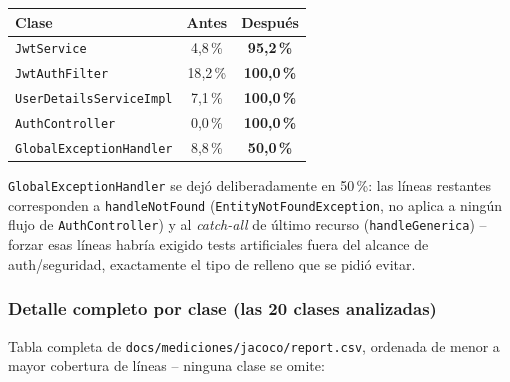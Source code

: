 \documentclass[12pt,a4paper]{article}
\begin{document}
\begin{center}
\begin{tabular}{|l|c|c|}
\hline
\rowcolor{verdeuteq}
\color{white}\textbf{Clase} & \color{white}\textbf{Antes} & \color{white}\textbf{Después} \\
\hline
\texttt{JwtService} & 4{,}8\,\% & \textbf{95{,}2\,\%} \\
\texttt{JwtAuthFilter} & 18{,}2\,\% & \textbf{100{,}0\,\%} \\
\texttt{UserDetailsServiceImpl} & 7{,}1\,\% & \textbf{100{,}0\,\%} \\
\texttt{AuthController} & 0{,}0\,\% & \textbf{100{,}0\,\%} \\
\texttt{GlobalExceptionHandler} & 8{,}8\,\% & \textbf{50{,}0\,\%} \\
\hline
\end{tabular}
\end{center}

\texttt{GlobalExceptionHandler} se dejó deliberadamente en 50\,\%: las
líneas restantes corresponden a \texttt{handleNotFound}
(\texttt{EntityNotFoundException}, no aplica a ningún flujo de
\texttt{AuthController}) y al \emph{catch-all} de último recurso
(\texttt{handleGenerica}) -- forzar esas líneas habría exigido tests
artificiales fuera del alcance de auth/seguridad, exactamente el tipo de
relleno que se pidió evitar.

\subsubsection*{Detalle completo por clase (las 20 clases analizadas)}

Tabla completa de \texttt{docs/mediciones/jacoco/report.csv}, ordenada de
menor a mayor cobertura de líneas -- ninguna clase se omite:
\end{document}
